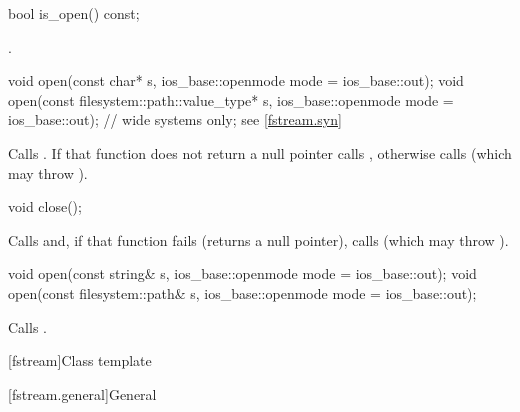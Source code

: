 %
\begin{itemdecl}
bool is_open() const;
\end{itemdecl}

\begin{itemdescr}
\pnum
\returns
{}.
\end{itemdescr}

%
\begin{itemdecl}
void open(const char* s, ios_base::openmode mode = ios_base::out);
void open(const filesystem::path::value_type* s,
          ios_base::openmode mode = ios_base::out);             // wide systems only; see \ref{fstream.syn}
\end{itemdecl}

\begin{itemdescr}
\pnum
\effects
Calls
.
If that function does not return a null pointer
calls ,
otherwise calls
(which may throw
).
\end{itemdescr}

%
\begin{itemdecl}
void close();
\end{itemdecl}

\begin{itemdescr}
\pnum
\effects
Calls
and, if that function fails (returns a null pointer), calls
(which may throw
).
\end{itemdescr}

%
\begin{itemdecl}
void open(const string& s, ios_base::openmode mode = ios_base::out);
void open(const filesystem::path& s, ios_base::openmode mode = ios_base::out);
\end{itemdecl}

\begin{itemdescr}
\pnum
\effects
Calls .
\end{itemdescr}

[fstream]{Class template }

[fstream.general]{General}

